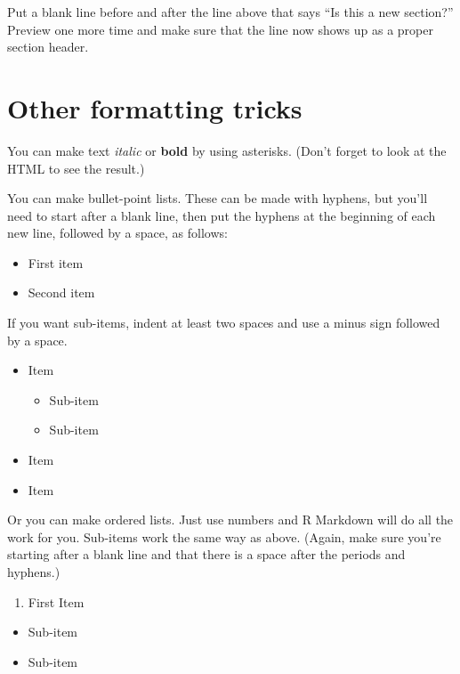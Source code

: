 \documentclass[
]{book}
\providecommand{\tightlist}{%
  \setlength{\itemsep}{0pt}\setlength{\parskip}{0pt}}
\begin{document}
Put a blank line before and after the line above that says ``Is this a new section?'' Preview one more time and make sure that the line now shows up as a proper section header.

\hypertarget{rmark-othertricks}{%
\section{Other formatting tricks}\label{rmark-othertricks}}

You can make text \emph{italic} or \textbf{bold} by using asterisks. (Don't forget to look at the HTML to see the result.)

You can make bullet-point lists. These can be made with hyphens, but you'll need to start after a blank line, then put the hyphens at the beginning of each new line, followed by a space, as follows:

\begin{itemize}
\tightlist
\item
  First item
\item
  Second item
\end{itemize}

If you want sub-items, indent at least two spaces and use a minus sign followed by a space.

\begin{itemize}
\tightlist
\item
  Item

  \begin{itemize}
  \tightlist
  \item
    Sub-item
  \item
    Sub-item
  \end{itemize}
\item
  Item
\item
  Item
\end{itemize}

Or you can make ordered lists. Just use numbers and R Markdown will do all the work for you. Sub-items work the same way as above. (Again, make sure you're starting after a blank line and that there is a space after the periods and hyphens.)

\begin{enumerate}
\def\labelenumi{\arabic{enumi}.}
\tightlist
\item
  First Item
\end{enumerate}

\begin{itemize}
\tightlist
\item
  Sub-item
\item
  Sub-item
\end{itemize}
\end{document}

